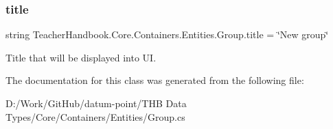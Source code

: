 \subsubsection{\texorpdfstring{title}{title}}
{\footnotesize\ttfamily string Teacher\+Handbook.\+Core.\+Containers.\+Entities.\+Group.\+title = \char`\"{}New group\char`\"{}}



Title that will be displayed into UI. 



The documentation for this class was generated from the following file\+:\begin{DoxyCompactItemize}
\item 
D\+:/\+Work/\+Git\+Hub/datum-\/point/\+T\+H\+B Data Types/\+Core/\+Containers/\+Entities/Group.\+cs\end{DoxyCompactItemize}
